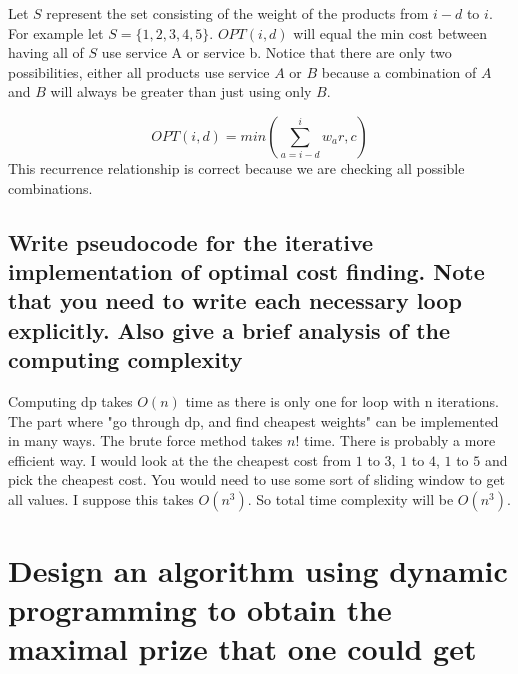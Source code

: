 \documentclass[11pt]{scrartcl}
\begin{document}
Let $S$ represent the set consisting  of the weight of the products from $i-d$ to $i$.
For example let $S = \{1,2,3,4,5\}$. 
$OPT(i,d)$ will equal the min cost between having all of $S$ use service A 
or service b. Notice that there are only two possibilities, either 
all products use service $A$ or $B$ because a combination of $A$ and $B$ will always 
be greater than just using only $B$.

$$OPT(i,d) = 
	min(\sum_{a = i-d}^i w_ar, c)
$$
This recurrence relationship is correct because we are checking all possible 
combinations. 

\subsection{
	Write pseudocode for the iterative implementation of optimal cost finding. Note
that you need to write each necessary loop explicitly. Also give a brief analysis of the
computing complexity
}

\begin{algorithm}
\end{algorithm}
Computing dp takes $O(n)$ time as there is only one for loop with n iterations. 
The part where "go through dp, and find cheapest weights" can be implemented in many ways.
The brute force method takes $n!$ time. There is probably a more efficient way.
I would look at the the cheapest cost from $1$ to $3$, $1$ to $4$, $1$ to $5$ and 
pick the cheapest cost. You would need to use some sort of sliding window to get all 
values. I suppose this takes $O(n^3)$. So total time complexity will be $O(n^3)$.

\section{
	Design an algorithm using dynamic programming to obtain the maximal
prize that one could get
}
\end{document}
